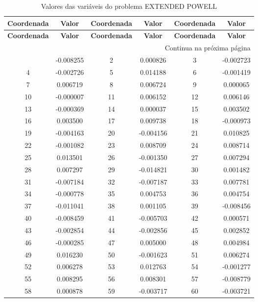 \documentclass[12pt]{article}
\begin{document}
\small
\begin{longtable}{@{}cc|cc|cc@{}}
\caption{Valores das variáveis do problema EXTENDED POWELL} \\
\toprule
\textbf{Coordenada} & \textbf{Valor} & \textbf{Coordenada} & \textbf{Valor} & \textbf{Coordenada} & \textbf{Valor} \\
\midrule
\endfirsthead

\toprule
\textbf{Coordenada} & \textbf{Valor} & \textbf{Coordenada} & \textbf{Valor} & \textbf{Coordenada} & \textbf{Valor} \\
\midrule
\endhead

\midrule \multicolumn{6}{r}{{Continua na próxima página}} \\ \midrule
\endfoot

\bottomrule
\endlastfoot
1 & -0.008255 & 2 & 0.000826 & 3 & -0.002723 \\
4 & -0.002726 & 5 & 0.014188 & 6 & -0.001419 \\
7 & 0.006719 & 8 & 0.006724 & 9 & 0.000065 \\
10 & -0.000007 & 11 & 0.006152 & 12 & 0.006146 \\
13 & -0.000369 & 14 & 0.000037 & 15 & 0.003502 \\
16 & 0.003500 & 17 & 0.009738 & 18 & -0.000973 \\
19 & -0.004163 & 20 & -0.004156 & 21 & 0.010825 \\
22 & -0.001082 & 23 & 0.008709 & 24 & 0.008714 \\
25 & 0.013501 & 26 & -0.001350 & 27 & 0.007294 \\
28 & 0.007297 & 29 & -0.014821 & 30 & 0.001482 \\
31 & -0.007184 & 32 & -0.007187 & 33 & 0.007781 \\
34 & -0.000778 & 35 & 0.004753 & 36 & 0.004754 \\
37 & -0.011041 & 38 & 0.001105 & 39 & -0.008456 \\
40 & -0.008459 & 41 & -0.005703 & 42 & 0.000571 \\
43 & -0.002854 & 44 & -0.002856 & 45 & 0.002852 \\
46 & -0.000285 & 47 & 0.005000 & 48 & 0.004984 \\
49 & 0.016230 & 50 & -0.001623 & 51 & 0.006274 \\
52 & 0.006278 & 53 & 0.012763 & 54 & -0.001277 \\
55 & 0.008295 & 56 & 0.008301 & 57 & -0.008779 \\
58 & 0.000878 & 59 & -0.003717 & 60 & -0.003721 \\

\end{longtable}
\end{document}

